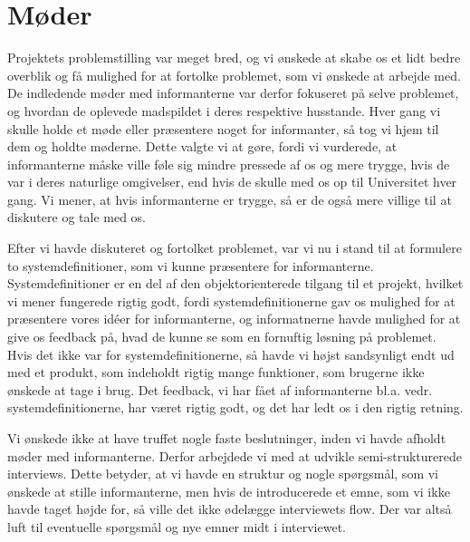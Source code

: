 \section{Møder}
Projektets problemstilling var meget bred, og vi ønskede at skabe os et lidt bedre overblik og få mulighed for at fortolke problemet, som vi ønskede at arbejde med. De indledende møder med informanterne var derfor fokuseret på selve problemet, og hvordan de oplevede madspildet i deres respektive husstande. Hver gang vi skulle holde et møde eller præsentere noget for informanter, så tog vi hjem til dem og holdte møderne. Dette valgte vi at gøre, fordi vi vurderede, at informanterne måske ville føle sig mindre pressede af os og mere trygge, hvis de var i deres naturlige omgivelser, end hvis de skulle med os op til Universitet hver gang. Vi mener, at hvis informanterne er trygge, så er de også mere villige til at diskutere og tale med os.

Efter vi havde diskuteret og fortolket problemet, var vi nu i stand til at formulere to systemdefinitioner, som vi kunne præsentere for informanterne. Systemdefinitioner er en del af den objektorienterede tilgang til et projekt, hvilket vi mener fungerede rigtig godt, fordi systemdefinitionerne gav os mulighed for at præsentere vores idéer for informanterne, og informatnerne havde mulighed for at give os feedback på, hvad de kunne se som en fornuftig løsning på problemet. Hvis det ikke var for systemdefinitionerne, så havde vi højst sandsynligt endt ud med et produkt, som indeholdt rigtig mange funktioner, som brugerne ikke ønskede at tage i brug. Det feedback, vi har fået af informanterne bl.a. vedr. systemdefinitionerne, har været rigtig godt, og det har ledt os i den rigtig retning. 

Vi ønskede ikke at have truffet nogle faste beslutninger, inden vi havde afholdt møder med informanterne. Derfor arbejdede vi med at udvikle semi-strukturerede interviews. Dette betyder, at vi havde en struktur og nogle spørgsmål, som vi ønskede at stille informanterne, men hvis de introducerede et emne, som vi ikke havde taget højde for, så ville det ikke ødelægge interviewets flow. Der var altså luft til eventuelle spørgsmål og nye emner midt i interviewet.

